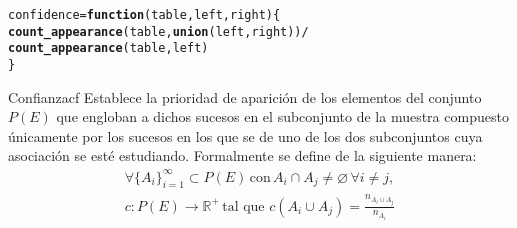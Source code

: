 \documentclass[12pt]{report}\usepackage[]{graphicx}\usepackage[dvipsnames]{xcolor}
\makeatletter
\newcommand{\hlopt}[1]{\textcolor[rgb]{0,0,0}{#1}}%
\newcommand{\hlstd}[1]{\textcolor[rgb]{0.345,0.345,0.345}{#1}}%
\newcommand{\hlkwa}[1]{\textcolor[rgb]{0.161,0.373,0.58}{\textbf{#1}}}%
\newcommand{\hlkwb}[1]{\textcolor[rgb]{0.69,0.353,0.396}{#1}}%
\newcommand{\hlkwc}[1]{\textcolor[rgb]{0.333,0.667,0.333}{#1}}%
\newcommand{\hlkwd}[1]{\textcolor[rgb]{0.737,0.353,0.396}{\textbf{#1}}}%
\newenvironment{kframe}{%
 \def\at@end@of@kframe{}%
 \ifinner\ifhmode%
  \def\at@end@of@kframe{\end{minipage}}%
  \begin{minipage}{\columnwidth}%
 \fi\fi%
 \def\FrameCommand##1{\hskip\@totalleftmargin \hskip-\fboxsep
 \colorbox{shadecolor}{##1}\hskip-\fboxsep
     \hskip-\linewidth \hskip-\@totalleftmargin \hskip\columnwidth}%
 \MakeFramed {\advance\hsize-\width
   \@totalleftmargin\z@ \linewidth\hsize
   \@setminipage}}%
 {\par\unskip\endMakeFramed%
 \at@end@of@kframe}
\newenvironment{knitrout}{}{} %
\makeatother
\begin{document}
\begin{knitrout}
\color{fgcolor}\begin{kframe}
\begin{alltt}
\hlstd{confidence} \hlkwb{=} \hlkwa{function}\hlstd{(}\hlkwc{table}\hlstd{,} \hlkwc{left}\hlstd{,} \hlkwc{right}\hlstd{) \{}
        \hlkwd{count_appearance}\hlstd{(table,} \hlkwd{union}\hlstd{(left, right))} \hlopt{/}
        \hlkwd{count_appearance}\hlstd{(table, left)}
\hlstd{\}}
\end{alltt}
\end{kframe}
\end{knitrout}
			
			\begin{definicion}{Confianza}{cf}
				Establece la prioridad de aparición de los elementos del conjunto $P(E)$ que engloban a dichos sucesos en el subconjunto de la muestra compuesto únicamente por los sucesos en los que se de uno de los dos subconjuntos cuya asociación se esté estudiando. Formalmente se define de la siguiente manera: 
				\begin{equation*}
					\begin{gathered}
						\forall\{A_i\}_{i=1}^\infty \subset P(E) \, \text{con} \, A_i \cap A_j \neq \varnothing \, \forall i \neq j, \\
						c: P(E) \longrightarrow \mathbb{R}^+ \, \text{tal que} \,\, c(A_i \cup A_j) = \frac{n_{A_i \cup A_j}}{n_{A_i}}
					\end{gathered}
				\end{equation*}
			\end{definicion}
			
\end{document}
